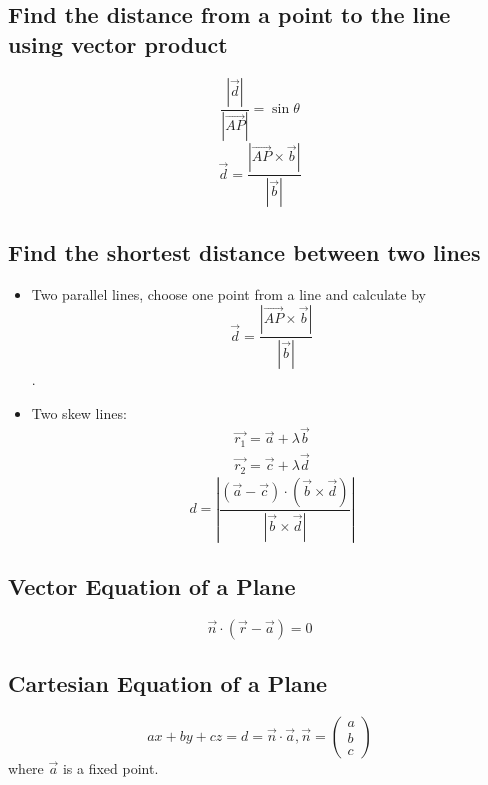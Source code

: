 \documentclass[a4paper,9pt]{scrartcl}
\newcommand{\vecabs}[1]{\left| \vec{#1} \right|}
\newcommand{\abs}[1]{\left| #1 \right|}
\begin{document}
    \subsection{Find the distance from a point to the line using vector product}
    \begin{displaymath}
        \frac{\vecabs{d}}{\vecabs{AP}} = \sin\theta
    \end{displaymath}
    \begin{displaymath}
        \vec{d} = \frac{\abs{\vec{AP}\times\vec{b}}}{\vecabs{b}}
    \end{displaymath}

    \subsection{Find the shortest distance between two lines}
    \begin{itemize}
        \item Two parallel lines, choose one point from a line and calculate by
        \begin{displaymath}
            \vec{d} = \frac{\abs{\vec{AP}\times\vec{b}}}{\vecabs{b}}
        \end{displaymath}.

        \item Two skew lines:
        \begin{align}
            \vec{r_1} = \vec{a} + {\lambda}\vec{b} \\
            \vec{r_2} = \vec{c} + {\lambda}\vec{d}
        \end{align}
        \begin{displaymath}
            d = \abs{\frac{\left( \vec{a}-\vec{c} \right)\cdot\left( \vec{b}\times\vec{d} \right)}{\abs{\vec{b}\times\vec{d}}}}
        \end{displaymath}
    \end{itemize}

    \subsection{Vector Equation of a Plane}
    \begin{displaymath}
        \vec{n}\cdot\left( \vec{r} - \vec{a} \right) = 0
    \end{displaymath}

    \subsection{Cartesian Equation of a Plane}
    \begin{displaymath}
        ax + by + cz = d = \vec{n}\cdot\vec{a}, \vec{n}=\begin{pmatrix}
                                                            a \\
                                                            b \\
                                                            c
        \end{pmatrix}
    \end{displaymath} where $\vec{a}$ is a fixed point.
\end{document}
